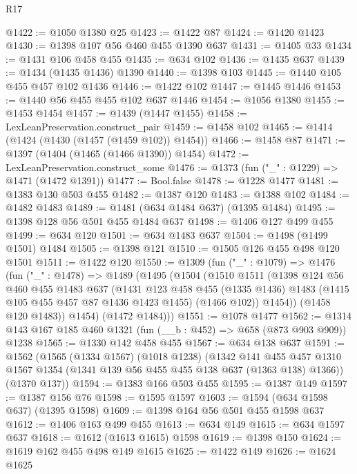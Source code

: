 \begin{lexlean}{R17}
\begin{coremodule}
@1422 := @1050 @1380 @25
@1423 := @1422 @87
@1424 := @1420 @1423
@1430 := @1398 @107 @56 @460 @455 @1390 @637
@1431 := @1405 @33
@1434 := @1431 @106 @458 @455
@1435 := @634 @102
@1436 := @1435 @637
@1439 := @1434 (@1435 @1436) @1390
@1440 := @1398 @103
@1445 := @1440 @105 @455 @457 @102 @1436
@1446 := @1422 @102
@1447 := @1445 @1446
@1453 := @1440 @56 @455 @455 @102 @637 @1446
@1454 := @1056 @1380
@1455 := @1453 @1454
@1457 := @1439 (@1447 @1455)
@1458 := LexLeanPreservation.construct_pair
@1459 := @1458 @102
@1465 := @1414 (@1424 (@1430 (@1457 (@1459 @102)) @1454))
@1466 := @1458 @87
@1471 := @1397 (@1404 (@1465 (@1466 @1390)) @1454)
@1472 := LexLeanPreservation.construct_some
@1476 := @1373 (fun ("_" : @1229) => @1471 (@1472 @1391))
@1477 := Bool.false
@1478 := @1228 @1477
@1481 := @1383 @130 @503 @455
@1482 := @1387 @120
@1483 := @1388 @102
@1484 := @1482 @1483
@1489 := @1481 (@634 @1484 @637) (@1395 @1484)
@1495 := @1398 @128 @56 @501 @455 @1484 @637
@1498 := @1406 @127 @499 @455
@1499 := @634 @120
@1501 := @634 @1483 @637
@1504 := @1498 (@1499 @1501) @1484
@1505 := @1398 @121
@1510 := @1505 @126 @455 @498 @120 @1501
@1511 := @1422 @120
@1550 := @1309
    (fun ("_" : @1079) =>
    @1476
      (fun ("_" : @1478) =>
      @1489
        (@1495
          (@1504
            (@1510
              @1511
              (@1398
                @124
                @56
                @460
                @455
                @1483
                @637
                (@1431
                  @123
                  @458
                  @455
                  (@1335 @1436)
                  @1483
                  (@1415 @105 @455 @457 @87 @1436 @1423 @1455)
                  (@1466 @102))
                @1454))
            (@1458 @120 @1483))
          @1454)
        (@1472 @1484)))
@1551 := @1078 @1477
@1562 := @1314 @143 @167 @185 @460 @1321 (fun (__b : @452) => @658 (@873 @903 @909)) @1238
@1565 := @1330 @142 @458 @455
@1567 := @634 @138 @637
@1591 := @1562
    (@1565
      (@1334 @1567)
      (@1018 @1238)
      (@1342
        @141
        @455
        @457
        @1310
        @1567
        @1354
        (@1341 @139 @56 @455 @455 @138 @637 (@1363 @138) @1366))
      (@1370 @137))
@1594 := @1383 @166 @503 @455
@1595 := @1387 @149
@1597 := @1387 @156 @76
@1598 := @1595 @1597
@1603 := @1594 (@634 @1598 @637) (@1395 @1598)
@1609 := @1398 @164 @56 @501 @455 @1598 @637
@1612 := @1406 @163 @499 @455
@1613 := @634 @149
@1615 := @634 @1597 @637
@1618 := @1612 (@1613 @1615) @1598
@1619 := @1398 @150
@1624 := @1619 @162 @455 @498 @149 @1615
@1625 := @1422 @149
@1626 := @1624 @1625

\end{coremodule}
\end{lexlean}
